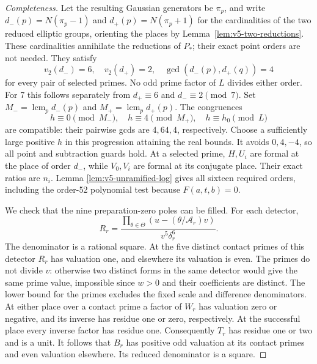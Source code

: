 \documentclass[11pt]{article}
\theoremstyle{definition}
\theoremstyle{remark}
\begin{document}
\begin{proof}[Completeness]
Let the resulting Gaussian generators be $\pi_p$, and write
$d_-(p)=N(\pi_p-1)$ and $d_+(p)=N(\pi_p+1)$ for the cardinalities
of the two reduced elliptic groups, orienting the places by
Lemma~\ref{lem:v5-two-reductions}. These cardinalities annihilate
the reductions of $P_*$; their exact point orders are not needed.
They satisfy
\[
 v_2(d_-)=6,\quad v_2(d_+)=2,\quad
 \gcd(d_-(p),d_+(q))=4
\]
for every pair of selected primes. No odd prime factor of $L$
divides either order. For 7 this follows separately from
$d_+\equiv6$ and $d_-\equiv2\pmod7$.
Set $M_-=\operatorname{lcm}_p d_-(p)$ and
$M_+=\operatorname{lcm}_p d_+(p)$. The congruences
\[
 h\equiv0\pmod{M_-},\quad h\equiv4\pmod{M_+},\quad
 h\equiv h_0\pmod L
\]
are compatible: their pairwise gcds are $4,64,4$, respectively.
Choose a sufficiently large positive $h$ in this progression
attaining the real bounds. It avoids $0,4,-4$, so all point and
subtraction guards hold. At a selected prime, $H,U_i$ are formal
at the place of order $d_-$, while $V_0,V_i$ are formal at its
conjugate place. Their exact ratios are $n_i$. Lemma
\ref{lem:v5-unramified-log} gives all sixteen required orders,
including the order-52 polynomial test because $F(a,t,b)=0$.

We check that the nine preparation-zero poles can be filled.
For each detector,
\[
 R_r=\frac{\prod_{\theta\in\Theta}
                   (u-(\theta/\mathcal A_r)v)}
                 {v^5\delta_r^6}.
\]
The denominator is a rational square. At the five distinct contact
primes of this detector $R_r$ has valuation one, and elsewhere
its valuation is even. The primes do not divide $v$: otherwise
two distinct forms in the same detector would give the same
prime value, impossible since $w>0$ and their coefficients are
distinct. The lower bound for the primes excludes the fixed scale
and difference denominators. At either place over a
contact prime a factor of $W_r$ has valuation zero or negative,
and its inverse has residue one or zero, respectively. At the
successful place every inverse factor has residue one.
Consequently $T_r$ has residue one or two and is a unit.
It follows that $B_r$ has positive odd valuation at its contact
primes and even valuation elsewhere. Its reduced denominator is
a square.


\end{proof}
\end{document}
